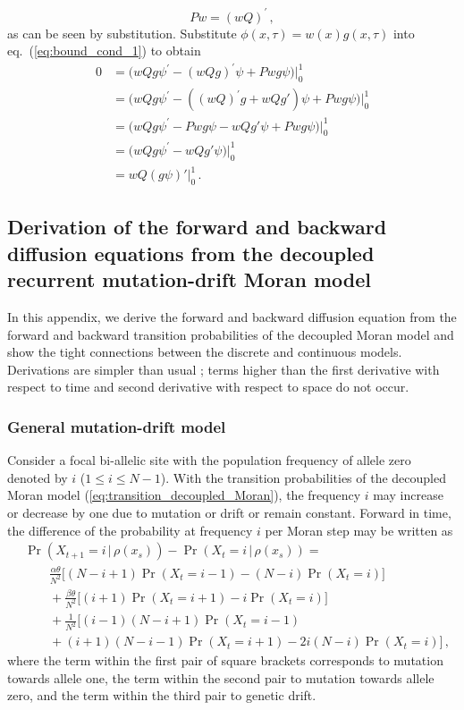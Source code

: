 \documentclass[preprint]{elsarticle}
\newcommand\given{{\,|\,}}
\newcommand\x[1]{\ensuremath{X_{#1}}}
\begin{document}
\begin{equation}
Pw=(wQ)^{'}\,,
\end{equation}
as can be seen by substitution. Substitute $\phi(x,\tau)=w(x)g(x,\tau)$ into eq.~(\ref{eq:bound_cond_1}) to obtain
\begin{equation}\label{eq:bound_cond_2}
\begin{split}
0&=\big(w Q g\psi^{'}-(w Q g)^{'}\psi+P w g\psi\big)\big|_0^1\\
&=\big(w Q g\psi^{'}-((w Q)^{'}g+w Q g')\psi+P w g\psi\big)\big|_0^1\\
&=\big(w Q g\psi^{'}-Pwg\psi-w Q g'\psi+P w g\psi\big)\big|_0^1\\
&=\big(w Q g\psi^{'}-w Qg'\psi\big)\big|_0^1\\
&=w Q(g\psi)'\big|_0^1\,.
\end{split}
\end{equation}

\subsection{Derivation of the forward and backward diffusion equations from the decoupled recurrent mutation-drift Moran model}
\label{section:diffDer}

In this appendix, we derive the forward and backward diffusion equation from the forward and backward transition probabilities of the decoupled Moran model and show the tight connections between the discrete and continuous models. Derivations are simpler than usual \citep{Ewen04}; terms higher than the first derivative with respect to time and second derivative with respect to space do not occur. 

\subsubsection{General mutation-drift model}
Consider a focal bi-allelic site with the population frequency of allele zero denoted by $i$ ($1 \leq i \leq N-1$). With the transition probabilities of the decoupled Moran model (\ref{eq:transition_decoupled_Moran}), the frequency $i$ may increase or decrease by one due to mutation or drift or remain constant. Forward in time, the difference of the probability at frequency $i$ per Moran step may be written as
\begin{equation}\label{eq:forw_discr_mutation}
\begin{split}
&\Pr(\x{t+1}=i\given \rho(x_s))-\Pr(\x{t}=i\given \rho(x_s)) = \\
&\qquad \frac{\alpha\theta}{N^2} \bigg[(N-i+1)\Pr(\x{t}=i-1) - (N-i)\Pr(\x{t}=i)\bigg]\\
&\qquad+\frac{\beta\theta}{N^2} \bigg[(i+1)\Pr(\x{t}=i+1) - i\Pr(\x{t}=i)\bigg]\\
&\qquad+\frac1{N^2}\bigg[(i-1)(N-i+1)\Pr(\x{t}=i-1) \\
&\qquad+ (i+1)(N-i-1)\Pr(\x{t}=i+1)-2i(N-i)\Pr(\x{t}=i)\bigg]\,,
\end{split}
\end{equation}
where the term within the first pair of square brackets corresponds to mutation towards allele one, the term within the second pair to mutation towards allele zero, and the term within the third pair to genetic drift.
\end{document}
